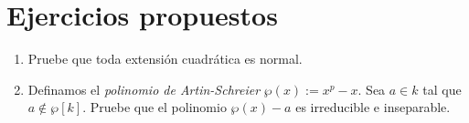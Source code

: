 \documentclass[11pt, reqno]{amsart}
\begin{document}
\appendix
\section{Ejercicios propuestos}
\begin{enumerate}
	\item\lookright
		Pruebe que toda extensión cuadrática es normal.
	\item Definamos el \emph{polinomio de Artin-Schreier} $\wp(x) := x^p - x$.
		Sea $a \in k$ tal que $a \notin \wp[k]$.
		Pruebe que el polinomio $\wp(x) - a$ es irreducible e inseparable.
\end{enumerate}

\nocite{jacobson:basic, nagata:fields}
\printbibliography
\end{document}
